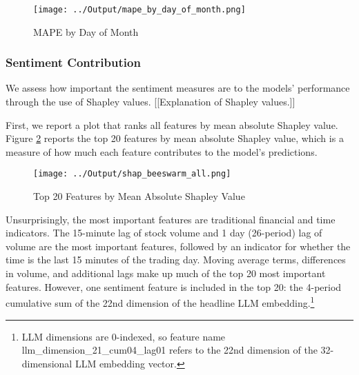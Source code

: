 \documentclass[12pt]{article}
\begin{document}
\begin{figure}[H]
    \centering
    \caption{MAPE by Day of Month}
    \texttt{[image: ../Output/mape\_by\_day\_of\_month.png]}
    \label{fig:mape_by_day_of_month}
\end{figure}

\subsubsection{Sentiment Contribution}
We assess how important the sentiment measures are to the models' performance through the use of Shapley values. [[Explanation of Shapley values.]]

First, we report a plot that ranks all features by mean absolute Shapley value. Figure \ref{fig:shapley_overall} reports the top 20 features by mean absolute Shapley value, which is a measure of how much each feature contributes to the model's predictions.
\begin{figure}[H]
    \centering
    \caption{Top 20 Features by Mean Absolute Shapley Value}
    \texttt{[image: ../Output/shap\_beeswarm\_all.png]}
    \label{fig:shapley_overall}
\end{figure}

Unsurprisingly, the most important features are traditional financial and time indicators. The 15-minute lag of stock volume and 1 day (26-period) lag of volume are the most important features, followed by an indicator for whether the time is the last 15 minutes of the trading day. Moving average terms, differences in volume, and additional lags make up much of the top 20 most important features. However, one sentiment feature is included in the top 20: the 4-period cumulative sum of the 22nd dimension of the headline LLM embedding.\footnote{LLM dimensions are 0-indexed, so feature name llm\_dimension\_21\_cum04\_lag01 refers to the 22nd dimension of the 32-dimensional LLM embedding vector.}
\end{document}

